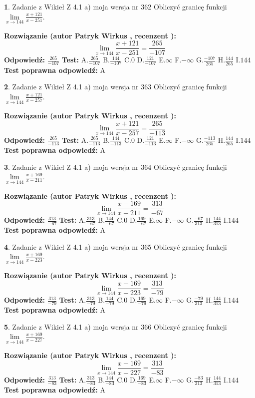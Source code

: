 \documentclass[12pt, a4paper]{article}
\theoremstyle{definition} %
\newtheorem{zad}{}
\newcommand{\zadStart}[1]{\begin{zad}#1\newline}
\newcommand{\zadStop}{\end{zad}}
\newcommand{\rozwStart}[2]{\noindent \textbf{Rozwiązanie (autor #1 , recenzent #2): }\newline}
\newcommand{\rozwStop}{\newline}
\newcommand{\odpStart}{\noindent \textbf{Odpowiedź:}\newline}
\newcommand{\odpStop}{\newline}
\newcommand{\testStart}{\noindent \textbf{Test:}\newline}
\newcommand{\testStop}{\newline}
\newcommand{\kluczStart}{\noindent \textbf{Test poprawna odpowiedź:}\newline}
\newcommand{\kluczStop}{\newline}
\begin{document}
\zadStart{Zadanie z Wikieł Z 4.1 a) moja wersja nr 362}
Obliczyć granicę funkcji $\lim\limits_{x\to144}\frac{x+121}{x-251}$.
\zadStop
\rozwStart{Patryk Wirkus}{}
$$\lim\limits_{x\to144}\frac{x+121}{x-251} = \frac{265}{-107}$$
\rozwStop
\odpStart
$\frac{265}{-107}$
\odpStop
\testStart
A.$\frac{265}{-107}$
B.$\frac{144}{-107}$
C.$0$
D.$\frac{121}{-107}$
E.$\infty$
F.$-\infty$
G.$\frac{-107}{265}$
H.$\frac{144}{265}$
I.$144$
\testStop
\kluczStart
A
\kluczStop



\zadStart{Zadanie z Wikieł Z 4.1 a) moja wersja nr 363}
Obliczyć granicę funkcji $\lim\limits_{x\to144}\frac{x+121}{x-257}$.
\zadStop
\rozwStart{Patryk Wirkus}{}
$$\lim\limits_{x\to144}\frac{x+121}{x-257} = \frac{265}{-113}$$
\rozwStop
\odpStart
$\frac{265}{-113}$
\odpStop
\testStart
A.$\frac{265}{-113}$
B.$\frac{144}{-113}$
C.$0$
D.$\frac{121}{-113}$
E.$\infty$
F.$-\infty$
G.$\frac{-113}{265}$
H.$\frac{144}{265}$
I.$144$
\testStop
\kluczStart
A
\kluczStop



\zadStart{Zadanie z Wikieł Z 4.1 a) moja wersja nr 364}
Obliczyć granicę funkcji $\lim\limits_{x\to144}\frac{x+169}{x-211}$.
\zadStop
\rozwStart{Patryk Wirkus}{}
$$\lim\limits_{x\to144}\frac{x+169}{x-211} = \frac{313}{-67}$$
\rozwStop
\odpStart
$\frac{313}{-67}$
\odpStop
\testStart
A.$\frac{313}{-67}$
B.$\frac{144}{-67}$
C.$0$
D.$\frac{169}{-67}$
E.$\infty$
F.$-\infty$
G.$\frac{-67}{313}$
H.$\frac{144}{313}$
I.$144$
\testStop
\kluczStart
A
\kluczStop



\zadStart{Zadanie z Wikieł Z 4.1 a) moja wersja nr 365}
Obliczyć granicę funkcji $\lim\limits_{x\to144}\frac{x+169}{x-223}$.
\zadStop
\rozwStart{Patryk Wirkus}{}
$$\lim\limits_{x\to144}\frac{x+169}{x-223} = \frac{313}{-79}$$
\rozwStop
\odpStart
$\frac{313}{-79}$
\odpStop
\testStart
A.$\frac{313}{-79}$
B.$\frac{144}{-79}$
C.$0$
D.$\frac{169}{-79}$
E.$\infty$
F.$-\infty$
G.$\frac{-79}{313}$
H.$\frac{144}{313}$
I.$144$
\testStop
\kluczStart
A
\kluczStop



\zadStart{Zadanie z Wikieł Z 4.1 a) moja wersja nr 366}
Obliczyć granicę funkcji $\lim\limits_{x\to144}\frac{x+169}{x-227}$.
\zadStop
\rozwStart{Patryk Wirkus}{}
$$\lim\limits_{x\to144}\frac{x+169}{x-227} = \frac{313}{-83}$$
\rozwStop
\odpStart
$\frac{313}{-83}$
\odpStop
\testStart
A.$\frac{313}{-83}$
B.$\frac{144}{-83}$
C.$0$
D.$\frac{169}{-83}$
E.$\infty$
F.$-\infty$
G.$\frac{-83}{313}$
H.$\frac{144}{313}$
I.$144$
\testStop
\kluczStart
A
\kluczStop
\end{document}
